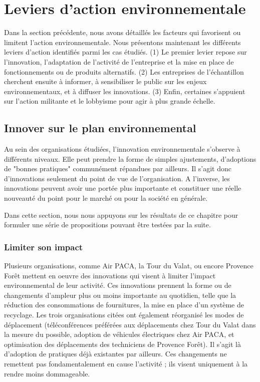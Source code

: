 
\section{Leviers d'action environnementale}
\label{section:lev_act_env}
Dans la section précédente, nous avons détaillés les facteurs qui favorisent ou limitent l'action environnementale. Nous présentons maintenant les différents leviers d'action identifiés parmi les cas étudiés. (1) Le premier levier repose sur l'innovation, l'adaptation de l'activité de l'entreprise et la mise en place de fonctionnements ou de produits alternatifs.  (2)  Les entreprises de l'échantillon cherchent ensuite à informer, à sensibiliser le public sur les enjeux environnementaux, et à diffuser les innovations. (3) Enfin, certaines s'appuient sur l'action militante et le lobbyisme pour agir à plus grande échelle. 


    \subsection{Innover sur le plan environnemental}
    
        Au sein des organisations étudiées, l'innovation environnementale s'observe à différents niveaux. Elle peut prendre la forme de simples ajustements, d'adoptions de "bonnes pratiques" communément répandues par ailleurs. Il s'agit donc d'innovations seulement du point de vue de l'organisation. A l'inverse, les innovations peuvent avoir une portée plus importante et constituer une réelle nouveauté du point pour le marché ou pour la société en générale. 
        
        Dans cette section, nous nous appuyons sur les résultats de ce chapitre pour formuler une série de propositions pouvant être testées par la suite. 
    
        \subsubsection{Limiter son impact}
        
            Plusieurs organisations, comme Air PACA, la Tour du Valat, ou encore Provence Forêt mettent en oeuvre des innovations qui visent à limiter l'impact environnemental de leur activité. Ces innovations prennent la forme ou de changements d'ampleur plus ou moins importante au quotidien, telle que la réduction des consommations de fournitures, la mise en place d'un système de recyclage. Les trois organisations citées ont également réorganisé les modes de déplacement (téléconférences préférées aux déplacements chez Tour du Valat dans la mesure du possible, adoption de véhicules électriques chez Air PACA, et optimisation des déplacements des techniciens de Provence Forêt). Il s'agit là d'adoption de pratiques déjà existantes par ailleurs. Ces changements ne remettent pas fondamentalement en cause l'activité ; ils visent uniquement à la rendre moins dommageable. 
            
